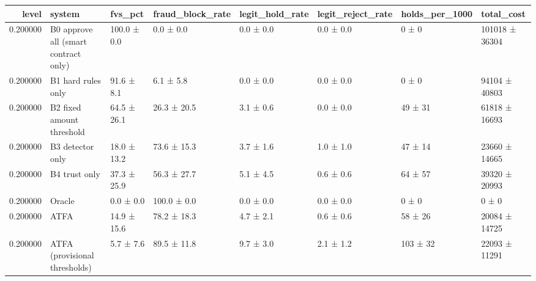 \begin{tabular}{rlllllll}
\toprule
level & system & fvs\_pct & fraud\_block\_rate & legit\_hold\_rate & legit\_reject\_rate & holds\_per\_1000 & total\_cost \\
\midrule
0.200000 & B0 approve all (smart contract only) & 100.0 ± 0.0 & 0.0 ± 0.0 & 0.0 ± 0.0 & 0.0 ± 0.0 & 0 ± 0 & 101018 ± 36304 \\
0.200000 & B1 hard rules only & 91.6 ± 8.1 & 6.1 ± 5.8 & 0.0 ± 0.0 & 0.0 ± 0.0 & 0 ± 0 & 94104 ± 40803 \\
0.200000 & B2 fixed amount threshold & 64.5 ± 26.1 & 26.3 ± 20.5 & 3.1 ± 0.6 & 0.0 ± 0.0 & 49 ± 31 & 61818 ± 16693 \\
0.200000 & B3 detector only & 18.0 ± 13.2 & 73.6 ± 15.3 & 3.7 ± 1.6 & 1.0 ± 1.0 & 47 ± 14 & 23660 ± 14665 \\
0.200000 & B4 trust only & 37.3 ± 25.9 & 56.3 ± 27.7 & 5.1 ± 4.5 & 0.6 ± 0.6 & 64 ± 57 & 39320 ± 20993 \\
0.200000 & Oracle & 0.0 ± 0.0 & 100.0 ± 0.0 & 0.0 ± 0.0 & 0.0 ± 0.0 & 0 ± 0 & 0 ± 0 \\
0.200000 & ATFA & 14.9 ± 15.6 & 78.2 ± 18.3 & 4.7 ± 2.1 & 0.6 ± 0.6 & 58 ± 26 & 20084 ± 14725 \\
0.200000 & ATFA (provisional thresholds) & 5.7 ± 7.6 & 89.5 ± 11.8 & 9.7 ± 3.0 & 2.1 ± 1.2 & 103 ± 32 & 22093 ± 11291 \\
\bottomrule
\end{tabular}
